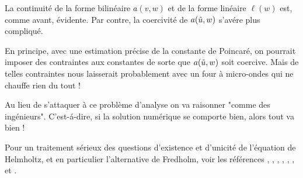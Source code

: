 La continuité de la forme bilinéaire $a(v, w)$ et de la forme linéaire
$\ell(w)$ est, comme avant, évidente. Par contre, la coercivité de
$a(\tilde{u}, w)$ s'avére plus compliqué.

En principe, avec une estimation précise de la constante de Poincaré,
on pourrait imposer des contraintes aux constantes de sorte que $a(\tilde{u}, w)$ soit
coercive. Mais de telles contraintes nous laisserait probablement avec un four
à micro-ondes qui ne chauffe rien du tout !


Au lieu de s'attaquer à ce problème d'analyse on va raisonner "comme des
ingénieurs". C'est-á-dire, si la solution numérique se comporte bien, alors
tout va bien !

Pour un traitement sérieux des questions d'existence et d'unicité
de l'équation de Helmholtz, et en particulier l'alternative de Fredholm,
voir les références \cite{fredholm1}, \cite{fredholm2}, \cite{fredholm3},
\cite{fredholm4}, \cite{fredholm5}, \cite{fredholm6}, et \cite{fredholm7}.


